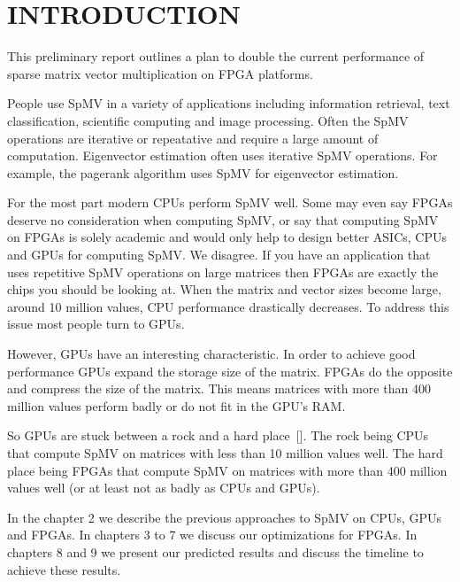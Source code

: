 \chapter{INTRODUCTION}
\label{chapter:introduction}
This preliminary report outlines a plan to double the current performance of sparse matrix vector multiplication on FPGA platforms.
\par People use SpMV in a variety of applications including information retrieval, text classification, scientific computing and image processing. Often the SpMV operations are iterative or repeatative and require a large amount of computation. Eigenvector estimation often uses iterative SpMV operations. For example, the pagerank algorithm uses SpMV for eigenvector estimation.
\par For the most part modern CPUs perform SpMV well. Some may even say FPGAs deserve no consideration when computing SpMV, or say that computing SpMV on FPGAs is solely academic and would only help to design better ASICs, CPUs and GPUs for computing SpMV. We disagree. If you have  an application that uses repetitive SpMV operations on large matrices then FPGAs are exactly the chips you should be looking at. When the matrix and vector sizes  become large, around 10 million values, CPU performance drastically decreases. To address this issue most people turn to GPUs.
\par However, GPUs have an interesting characteristic. In order to achieve good performance GPUs expand the storage size of the matrix. FPGAs do the opposite and compress the size of the matrix. This means matrices with more than 400 million values perform badly or do not fit in the GPU's RAM.
\par So GPUs are stuck between a rock and a hard place~[\cite{prelim:davis0}]. The rock being CPUs that compute SpMV on matrices with less than 10 million values well. The hard place being FPGAs that compute SpMV on matrices with more than 400 million values well (or at least not as badly as CPUs and GPUs).
\par In the chapter 2 we describe the previous approaches to SpMV on CPUs, GPUs and FPGAs. In chapters 3 to 7 we discuss our optimizations for FPGAs. In chapters 8 and 9 we present our predicted results and discuss the timeline to achieve these results.
